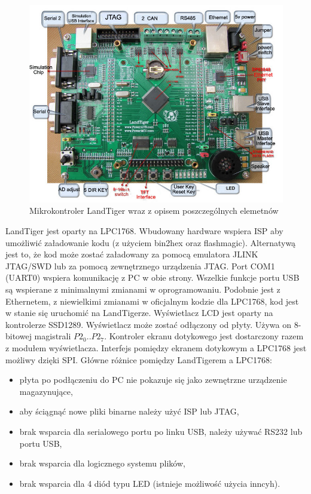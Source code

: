 \documentclass{BscUS}
\begin{document}
\begin{figure}[h]
\centering
\includegraphics{./img/landTiger3}
\caption{Mikrokontroler LandTiger wraz z opisem poszczególnych elemetnów \cite{landTiger3}}
\end{figure}
LandTiger jest oparty na LPC1768. Wbudowany hardware wspiera ISP aby umożliwić załadowanie kodu (z użyciem bin2hex oraz flashmagic).
Alternatywą jest to, że kod może zostać załadowany za pomocą emulatora JLINK JTAG/SWD lub za pomocą zewnętrznego urządzenia JTAG.
\newline
Port COM1 (UART0) wspiera komunikację z PC w obie strony. Wszelkie funkcje portu USB są wspierane z minimalnymi zmianami w oprogramowaniu. Podobnie jest z Ethernetem, z niewielkimi  zmianami w oficjalnym kodzie dla LPC1768, kod jest w stanie się uruchomić na LandTigerze.
\newline
\indent Wyświetlacz LCD jest oparty na kontrolerze SSD1289. Wyświetlacz może zostać odłączony od płyty. Używa on 8-bitowej magistrali \(P2_0..P2_7\). Kontroler ekranu dotykowego jest dostarczony razem z modułem wyświetlacza. Interfejs pomiędzy ekranem dotykowym a LPC1768 jest możliwy dzięki SPI.
\newline
Główne różnice pomiędzy LandTigerem a LPC1768:
\begin{itemize} %
\item płyta po podłączeniu do PC nie pokazuje się jako zewnętrzne urządzenie magazynujące,
\item aby ściągnąć nowe pliki binarne należy użyć ISP lub JTAG,
\item brak wsparcia dla serialowego portu po linku USB, należy używać RS232 lub portu USB,
\item brak wsparcia dla logicznego systemu plików,
\item brak wsparcia dla 4 diód typu LED (istnieje możliwość użycia inncyh).
\end{itemize}
\end{document}
